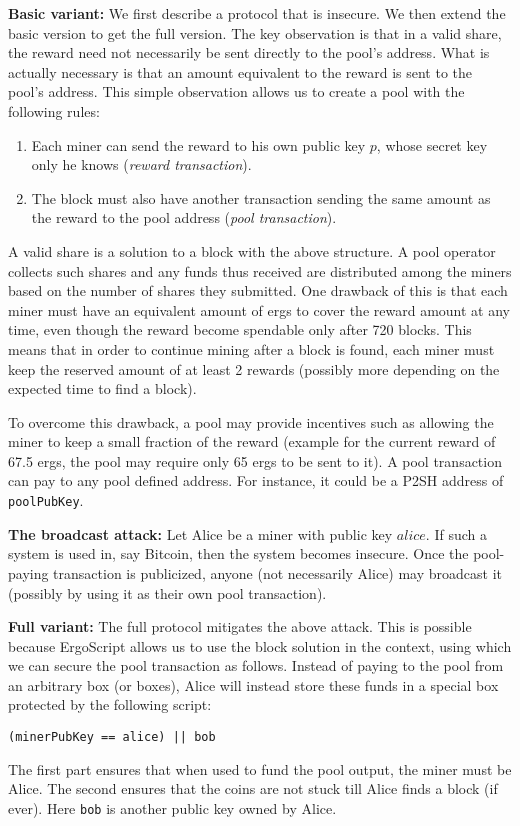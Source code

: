\documentclass[11pt]{article}
\newcommand{\langname}{ErgoScript\xspace}
\begin{document}
\textbf{Basic variant:} We first describe a protocol that is insecure. We then extend the basic version to get the full version. The key observation is that in a valid share, the reward need not necessarily be sent directly to the pool's address. What is actually necessary is that an amount equivalent to the reward is sent to the pool's address. This simple observation allows us to create a pool with the following rules:
\begin{enumerate}
	\item Each miner can send the reward to his own public key $p$, whose secret key only he knows ({\em reward transaction}).
	\item The block must also have another transaction sending the same amount as the reward to the pool address ({\em pool transaction}).
\end{enumerate}

A valid share is a solution to a block with the above structure. A pool operator collects such shares and any funds thus received are distributed among the miners based on the number of shares they submitted. One drawback of this is that each miner must have an equivalent amount of ergs to cover the reward amount at any time, even though the reward become spendable only after 720 blocks. 
This means that in order to continue mining after a block is found, each miner must keep the reserved amount of at least 2 rewards (possibly more depending on the expected time to find a block).

 To overcome this drawback, a pool may provide incentives such as allowing the miner to keep a small fraction of the reward (example for the current reward of 67.5 ergs, the pool may require only 65 ergs to be sent to it). A pool transaction can pay to any pool defined address. For instance, it could be a P2SH address of \texttt{poolPubKey}. 


\textbf{The broadcast attack:} Let Alice be a miner with public key $alice$. If such a system is used in, say Bitcoin, then the system becomes insecure. Once the pool-paying transaction is publicized, anyone (not necessarily Alice) may broadcast it (possibly by using it as their own pool transaction). 

\textbf{Full variant:} The full protocol mitigates the above attack. This is possible because \langname allows us to use the block solution in the context, using which we can secure the pool transaction as follows. Instead of paying to the pool from an arbitrary box (or boxes), Alice will instead store these funds in a special box protected by the following script:
\begin{verbatim}
(minerPubKey == alice) || bob
\end{verbatim}
The first part ensures that when used to fund the pool output, the miner must be Alice. The second ensures that the coins are not stuck till Alice finds a block (if ever). Here \texttt{bob} is another public key owned by Alice.
\end{document}

